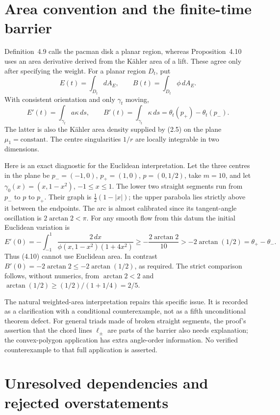 \documentclass[10pt]{article}
\begin{document}
\section*{Area convention and the finite-time barrier}
Definition 4.9 calls the pacman disk a planar region, whereas Proposition 4.10 uses an area derivative derived from the Kähler area of a lift. These agree only after specifying the weight. For a planar region \(D_t\), put \[E(t)=\int_{D_t}dA_E,\qquad B(t)=\int_{D_t}\phi\,dA_E .\] With consistent orientation and only \(\gamma_t\) moving, \[E'(t)=\int_{\gamma_t}a\kappa\,ds,\qquad
 B'(t)=\int_{\gamma_t}\kappa\,ds
       =\theta_t(p_+)-\theta_t(p_-).\] The latter is also the Kähler area density supplied by (2.5) on the plane \(\mu_1=\mathrm{constant}\). The centre singularities \(1/r\) are locally integrable in two dimensions.\par
Here is an exact diagnostic for the Euclidean interpretation. Let the three centres in the plane be \(p_-=(-1,0)\), \(p_+=(1,0)\), \(p=(0,1/2)\), take \(m=10\), and let \(\gamma_0(x)=(x,1-x^2)\), \(-1\leq x\leq1\). The lower two straight segments run from \(p_-\) to \(p\) to \(p_+\). Their graph is \(\frac12(1-|x|)\); the upper parabola lies strictly above it between the endpoints. The arc is almost calibrated since its tangent-angle oscillation is \(2\arctan2<\pi\). For any smooth flow from this datum the initial Euclidean variation is \[E'(0)=-\int_{-1}^1\frac{2\,dx}{\phi(x,1-x^2)(1+4x^2)}
 \geq-\frac{2\arctan2}{10}>-2\arctan(1/2)
 =\theta_+-\theta_- .\] Thus (4.10) cannot use Euclidean area. In contrast \(B'(0)=-2\arctan2\leq-2\arctan(1/2)\), as required. The strict comparison follows, without numerics, from \(\arctan2<2\) and \(\arctan(1/2)\geq(1/2)/(1+1/4)=2/5\).\par
The natural weighted-area interpretation repairs this specific issue. It is recorded as a clarification with a conditional counterexample, not as a fifth unconditional theorem defect. For general triads made of broken straight segments, the proof’s assertion that the chord lines \(\ell_\pm\) are parts of the barrier also needs explanation; the convex-polygon application has extra angle-order information. No verified counterexample to that full application is asserted.\par
\section*{Unresolved dependencies and rejected overstatements}
\end{document}
